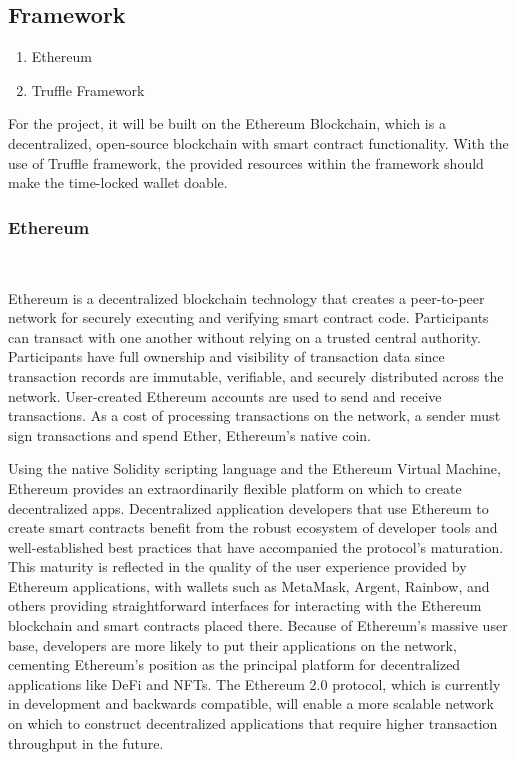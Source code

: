 \documentclass[10pt,twocolumn]{article}
\begin{document}
\subsection{Framework}
\begin{enumerate}
  \item Ethereum
  \item Truffle Framework
\end{enumerate}
    
For the project, it will be built on the Ethereum Blockchain, which is a decentralized, open-source blockchain with smart contract functionality. With the use of Truffle framework, the provided resources within the framework should make the time-locked wallet doable.

\subsubsection{Ethereum}\

Ethereum is a decentralized blockchain technology that creates a peer-to-peer network for securely executing and verifying smart contract code. Participants can transact with one another without relying on a trusted central authority. Participants have full ownership and visibility of transaction data since transaction records are immutable, verifiable, and securely distributed across the network. User-created Ethereum accounts are used to send and receive transactions. As a cost of processing transactions on the network, a sender must sign transactions and spend Ether, Ethereum's native coin.\cite{Eth}

Using the native Solidity scripting language and the Ethereum Virtual Machine, Ethereum provides an extraordinarily flexible platform on which to create decentralized apps. Decentralized application developers that use Ethereum to create smart contracts benefit from the robust ecosystem of developer tools and well-established best practices that have accompanied the protocol's maturation.
This maturity is reflected in the quality of the user experience provided by Ethereum applications, with wallets such as MetaMask, Argent, Rainbow, and others providing straightforward interfaces for interacting with the Ethereum blockchain and smart contracts placed there. Because of Ethereum's massive user base, developers are more likely to put their applications on the network, cementing Ethereum's position as the principal platform for decentralized applications like DeFi and NFTs. The Ethereum 2.0 protocol, which is currently in development and backwards compatible, will enable a more scalable network on which to construct decentralized applications that require higher transaction throughput in the future.\cite{Eth}
	
\end{document}
